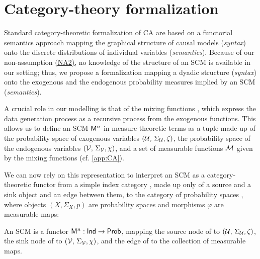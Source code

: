 \section{Category-theory formalization}
Standard category-theoretic formalization of CA \cite{rischel2020category,otsuka2022equivalence} are based on a functorial semantics \cite{jacobs2019causal} approach mapping the graphical structure of causal models (\emph{syntax}) onto the discrete distributions of individual variables (\emph{semantics}). 
Because of our non-assumption \hyperlink{(NA2)}{(NA2)}, no knowledge of the structure of an SCM is available in our setting; thus, we propose a formalization mapping a dyadic structure (\emph{syntax}) onto the exogenous and the endogenous probability measures implied by an SCM (\emph{semantics}).

A crucial role in our modelling is that of the mixing functions \mymixing, which express the data generation process as a recursive process from the exogenous functions. This allows us to define an SCM $\mathsf{M}^n$ in measure-theoretic terms as a tuple made up of the probability space of exogenous variables $(\mathcal{U},\, \Sigma_{\mathcal{U}}, \zeta)$, the probability space of the endogenous variables $(\mathcal{V},\, \Sigma_{\mathcal{V}}, \chi)$, and a set of measurable functions $\mathcal{M}$ given by the mixing functions (cf. \cref{app:CA}).

We can now rely on this representation to  interpret an SCM as a category-theoretic functor from a simple index category \Index, made up only of a source and a sink object and an edge between them, to the category of probability spaces \Prob, where objects $(X,\Sigma_X, p)$ are probability spaces and morphisms $\varphi$ are measurable maps:
\begin{definition}\label{def:SCM_ct}
    An SCM is a functor $\mathsf{M}^n: \mathsf{Ind} \rightarrow \mathsf{Prob}$, mapping the source node of \Index to $(\mathcal{U},\, \Sigma_{\mathcal{U}}, \zeta)$, the sink node of \Index to $(\mathcal{V},\, \Sigma_{\mathcal{V}}, \chi)$, and the  edge of \Index to the collection \mymixing of measurable maps.
\end{definition} 



